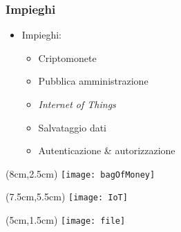 \begin{frame}
  \frametitle{Impieghi}

  \begin{itemize}
   \item<1-> Impieghi:
   \begin{itemize}
    \item<2-> Criptomonete
    \item<3-> Pubblica amministrazione
    \item<4-> \textit{Internet of Things}
    \item<5-> Salvataggio dati
    \item<6-> Autenticazione \& autorizzazione
   \end{itemize}
  \end{itemize}

 \begin{textblock*}{5cm}(8cm,2.5cm)
  \texttt{[image: bagOfMoney]}
 \end{textblock*}

 \begin{textblock*}{5cm}(7.5cm,5.5cm)
  \texttt{[image: IoT]}
 \end{textblock*}

 \begin{textblock*}{5cm}(5cm,1.5cm)
  \texttt{[image: file]}
 \end{textblock*}


\end{frame}
